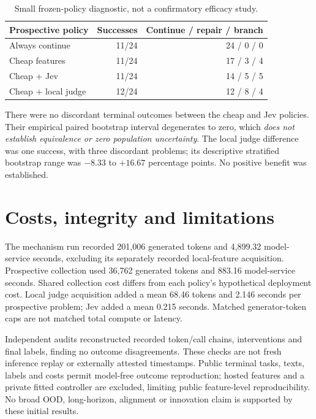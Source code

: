\documentclass[11pt]{article}
\begin{document}
\begin{table}[h]
\centering
\begin{tabular}{lrr}
\toprule
Prospective policy & Successes & Continue / repair / branch\\
\midrule
Always continue & 11/24 & 24 / 0 / 0\\
Cheap features & 11/24 & 17 / 3 / 4\\
Cheap + Jev & 11/24 & 14 / 5 / 5\\
Cheap + local judge & 12/24 & 12 / 8 / 4\\
\bottomrule
\end{tabular}
\caption{Small frozen-policy diagnostic, not a confirmatory efficacy study.}
\end{table}

There were no discordant terminal outcomes between the cheap and Jev policies. Their empirical paired bootstrap interval degenerates to zero, which \emph{does not establish equivalence or zero population uncertainty}. The local judge difference was one success, with three discordant problems; its descriptive stratified bootstrap range was $-8.33$ to $+16.67$ percentage points. No positive benefit was established.

\section{Costs, integrity and limitations}
The mechanism run recorded 201,006 generated tokens and 4,899.32 model-service seconds, excluding its separately recorded local-feature acquisition. Prospective collection used 36,762 generated tokens and 883.16 model-service seconds. Shared collection cost differs from each policy's hypothetical deployment cost. Local judge acquisition added a mean 68.46 tokens and 2.146 seconds per prospective problem; Jev added a mean 0.215 seconds. Matched generator-token caps are not matched total compute or latency.

Independent audits reconstructed recorded token/call chains, interventions and final labels, finding no outcome disagreements. These checks are not fresh inference replay or externally attested timestamps. Public terminal tasks, texts, labels and costs permit model-free outcome reproduction; hosted features and a private fitted controller are excluded, limiting public feature-level reproducibility. No broad OOD, long-horizon, alignment or innovation claim is supported by these initial results.
\end{document}

